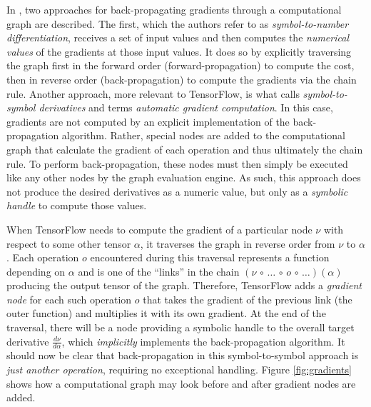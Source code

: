 In \cite{goodfellow2016}, two approaches for back-propagating gradients through
a computational graph are described. The first, which the authors refer to as
\emph{symbol-to-number differentiation}, receives a set of input values and then
computes the \emph{numerical values} of the gradients at those input values. It
does so by explicitly traversing the graph first in the forward order
(forward-propagation) to compute the cost, then in reverse order
(back-propagation) to compute the gradients via the chain rule. Another
approach, more relevant to TensorFlow, is what \cite{goodfellow2016} calls
\emph{symbol-to-symbol derivatives} and \cite{tensorflow} terms \emph{automatic
  gradient computation}. In this case, gradients are not computed by an explicit
implementation of the back-propagation algorithm. Rather, special nodes are added
to the computational graph that calculate the gradient of each operation and
thus ultimately the chain rule. To perform back-propagation, these nodes must
then simply be executed like any other nodes by the graph evaluation engine. As
such, this approach does not produce the desired derivatives as a numeric value,
but only as a \emph{symbolic handle} to compute those values.

When TensorFlow needs to compute the gradient of a particular node $\nu$ with
respect to some other tensor $\alpha$, it traverses the graph in reverse order
from $\nu$ to $\alpha$. Each operation $o$ encountered during this traversal
represents a function depending on $\alpha$ and is one of the ``links'' in the
chain $(\nu \,\circ\, \dots\, \circ\, o \,\circ\, \dots)(\alpha)$ producing the
output tensor of the graph. Therefore, TensorFlow adds a \emph{gradient node}
for each such operation $o$ that takes the gradient of the previous link (the
outer function) and multiplies it with its own gradient. At the end of the
traversal, there will be a node providing a symbolic handle to the overall
target derivative $\frac{d\nu}{d\alpha}$, which \emph{implicitly} implements the
back-propagation algorithm. It should now be clear that back-propagation in this
symbol-to-symbol approach is \emph{just another operation}, requiring no
exceptional handling. Figure \ref{fig:gradients} shows how a computational graph
may look before and after gradient nodes are added.

